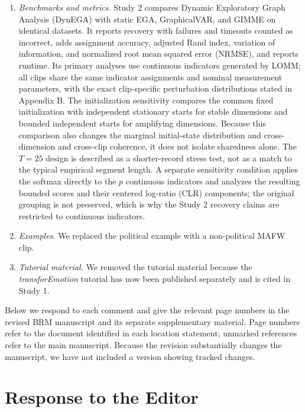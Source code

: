 \documentclass[11pt]{article}
\begin{document}
\begin{enumerate}
  \item \textit{Benchmarks and metrics.} Study 2 compares Dynamic Exploratory Graph Analysis (DynEGA) with static EGA, GraphicalVAR, and GIMME on identical datasets. It reports recovery with failures and timeouts counted as incorrect, adds assignment accuracy, adjusted Rand index, variation of information, and normalized root mean squared error (NRMSE), and reports runtime. Its primary analyses use continuous indicators generated by LOMM; all clips share the same indicator assignments and nominal measurement parameters, with the exact clip-specific perturbation distributions stated in Appendix B. The initialization sensitivity compares the common fixed initialization with independent stationary starts for stable dimensions and bounded independent starts for amplifying dimensions. Because this comparison also changes the marginal initial-state distribution and cross-dimension and cross-clip coherence, it does not isolate sharedness alone. The \(T=25\) design is described as a shorter-record stress test, not as a match to the typical empirical segment length. A separate sensitivity condition applies the softmax directly to the \(p\) continuous indicators and analyzes the resulting bounded scores and their centered log-ratio (CLR) components; the original grouping is not preserved, which is why the Study 2 recovery claims are restricted to continuous indicators.
  \item \textit{Examples.} We replaced the political example with a non-political MAFW clip.
  \item \textit{Tutorial material.} We removed the tutorial material because the \textit{transforEmotion} tutorial has now been published separately and is cited in Study 1.
\end{enumerate}

Below we respond to each comment and give the relevant page numbers in the revised BRM manuscript and its separate supplementary material. Page numbers refer to the document identified in each location statement; unmarked references refer to the main manuscript. Because the revision substantially changes the manuscript, we have not included a version showing tracked changes.

\section*{Response to the Editor}
\end{document}
